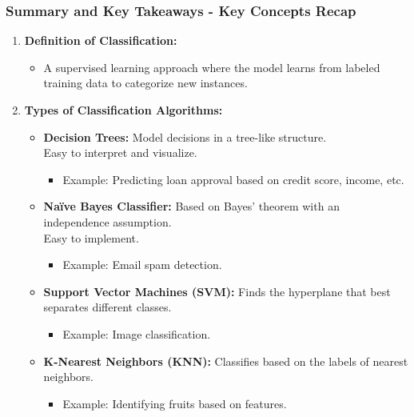\documentclass[aspectratio=169]{beamer}
\begin{document}
\begin{frame}[fragile]
    \frametitle{Summary and Key Takeaways - Key Concepts Recap}
    \begin{enumerate}
        \item \textbf{Definition of Classification:}
        \begin{itemize}
            \item A supervised learning approach where the model learns from labeled training data to categorize new instances.
        \end{itemize}

        \item \textbf{Types of Classification Algorithms:}
        \begin{itemize}
            \item \textbf{Decision Trees:} Model decisions in a tree-like structure. \\ 
            Easy to interpret and visualize.
            \begin{itemize}
                \item Example: Predicting loan approval based on credit score, income, etc.
            \end{itemize}
            \item \textbf{Naïve Bayes Classifier:} Based on Bayes' theorem with an independence assumption. \\
            Easy to implement.
            \begin{itemize}
                \item Example: Email spam detection.
            \end{itemize}
            \item \textbf{Support Vector Machines (SVM):} Finds the hyperplane that best separates different classes.
            \begin{itemize}
                \item Example: Image classification.
            \end{itemize}
            \item \textbf{K-Nearest Neighbors (KNN):} Classifies based on the labels of nearest neighbors.
            \begin{itemize}
                \item Example: Identifying fruits based on features.
            \end{itemize}
        \end{itemize}
    \end{enumerate}
\end{frame}
\end{document}
